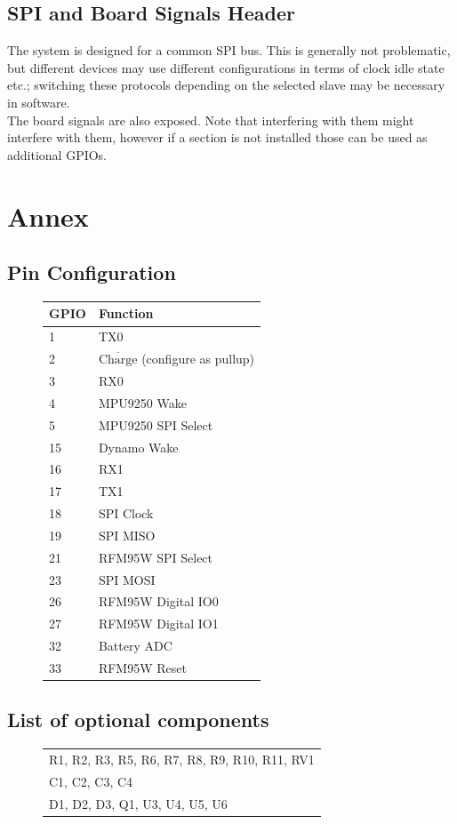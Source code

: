 \documentclass{article}
\begin{document}
\subsection{SPI and Board Signals Header}
The system is designed for a common SPI bus. This is generally not problematic, but different devices may use different configurations in terms of clock idle state etc.; switching these protocols depending on the selected slave may be necessary in software.\\
The board signals are also exposed. Note that interfering with them might interfere with them, however if a section is not installed those can be used as additional GPIOs.

\section*{Annex}
\subsection*{Pin Configuration}
\begin{figure}[h]
\centering
\begin{tabular}{ l l }
    GPIO & Function \\
    \hline
    1 & TX0\\
    2 & $\overline{\textrm{Charge}}$ (configure as pullup)\\
    3 & RX0\\
    4 & MPU9250 Wake \\
    5 & MPU9250 SPI Select \\
    15 & Dynamo Wake\\
    16 & RX1 \\
    17 & TX1 \\
    18 & SPI Clock \\
    19 & SPI MISO \\
    21 & RFM95W SPI Select\\
    23 & SPI MOSI \\
    26 & RFM95W Digital IO0\\
    27 & RFM95W Digital IO1\\
    32 & Battery ADC\\
    33 & RFM95W Reset
\end{tabular}
\end{figure}

\subsection*{List of optional components}
\begin{figure}[h]
\centering
\begin{tabular}{l}
    R1, R2, R3, R5, R6, R7, R8, R9, R10, R11, RV1\\
    C1, C2, C3, C4\\
    D1, D2, D3, Q1, U3, U4, U5, U6
\end{tabular}
\end{figure}
\end{document}
